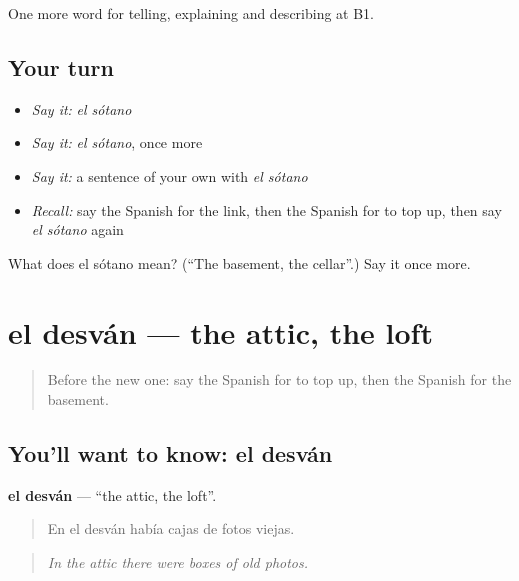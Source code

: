 \begin{grammarlens}[title={What you've built}]
One more word for telling, explaining and describing at B1.
\end{grammarlens}

\subsection*{Your turn}
\begin{itemize}
\raggedright
  \item \emph{Say it:} \emph{el sótano}
  \item \emph{Say it:} \emph{el sótano}, once more
  \item \emph{Say it:} a sentence of your own with \emph{el sótano}
  \item \emph{Recall:} say the Spanish for the link, then the Spanish for to top up, then say \emph{el sótano} again
\end{itemize}

\begin{tcolorbox}[breakable,colback=teal!4,colframe=teal!35!black,title={Before you move on}]
What does el sótano mean? (\textquotedblleft{}The basement, the cellar\textquotedblright{}.) Say it once more.
\end{tcolorbox}
\section[el desván]{el desván — the attic, the loft}

\label{lesson:ES-C774-desvan}



\begin{quote}
Before the new one: say the Spanish for to top up, then the Spanish for the basement.
\end{quote}

\subsection*{You'll want to know: el desván}
\textbf{el desván} — \textquotedblleft{}the attic, the loft\textquotedblright{}.

\begin{quote}
En el desván había cajas de fotos viejas.
\end{quote}

\begin{quote}
\emph{In the attic there were boxes of old photos.}
\end{quote}

